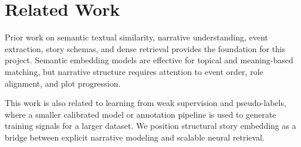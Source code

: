 \section{Related Work}

Prior work on semantic textual similarity, narrative understanding, event extraction, story schemas, and dense retrieval provides the foundation for this project. Semantic embedding models are effective for topical and meaning-based matching, but narrative structure requires attention to event order, role alignment, and plot progression.

This work is also related to learning from weak supervision and pseudo-labels, where a smaller calibrated model or annotation pipeline is used to generate training signals for a larger dataset. We position structural story embedding as a bridge between explicit narrative modeling and scalable neural retrieval.
